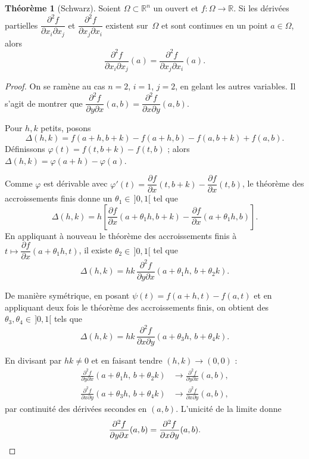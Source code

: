 \documentclass[12pt,a4paper,openany]{book}
\theoremstyle{definition}
\newtheorem{theoreme}{Théorème}[chapter]
\newcommand{\R}{\mathbb{R}}
\begin{document}
\begin{theoreme}[Schwarz]
  \label{thm:schwarz}
  Soient $\Omega \subset \R^n$ un ouvert et $f \colon \Omega \to \R$. Si les dérivées partielles $\dfrac{\partial^2 f}{\partial x_i \partial x_j}$ et $\dfrac{\partial^2 f}{\partial x_j \partial x_i}$ existent sur~$\Omega$ et sont continues en un point $a \in \Omega$, alors
  \[
    \frac{\partial^2 f}{\partial x_i \partial x_j}(a) = \frac{\partial^2 f}{\partial x_j \partial x_i}(a).
  \]
\end{theoreme}

\begin{proof}
  On se ramène au cas $n = 2$, $i = 1$, $j = 2$, en gelant les autres variables. Il s'agit de montrer que $\dfrac{\partial^2 f}{\partial y \partial x}(a,b) = \dfrac{\partial^2 f}{\partial x \partial y}(a,b)$.

  Pour $h, k$ petits, posons
  \[
    \Delta(h,k) = f(a+h, b+k) - f(a+h, b) - f(a, b+k) + f(a,b).
  \]
  Définissons $\varphi(t) = f(t, b+k) - f(t, b)$ ; alors $\Delta(h,k) = \varphi(a+h) - \varphi(a)$.

  Comme $\varphi$ est dérivable avec $\varphi'(t) = \dfrac{\partial f}{\partial x}(t, b+k) - \dfrac{\partial f}{\partial x}(t, b)$, le théorème des accroissements finis donne un $\theta_1 \in\, ]0,1[$ tel que
  \[
    \Delta(h,k) = h \left[\frac{\partial f}{\partial x}(a + \theta_1 h, b+k) - \frac{\partial f}{\partial x}(a + \theta_1 h, b)\right].
  \]
  En appliquant à nouveau le théorème des accroissements finis à $t \mapsto \dfrac{\partial f}{\partial x}(a + \theta_1 h, t)$, il existe $\theta_2 \in\, ]0,1[$ tel que
  \[
    \Delta(h,k) = hk \, \frac{\partial^2 f}{\partial y \partial x}(a + \theta_1 h, \, b + \theta_2 k).
  \]

  De manière symétrique, en posant $\psi(t) = f(a+h, t) - f(a, t)$ et en appliquant deux fois le théorème des accroissements finis, on obtient des $\theta_3, \theta_4 \in\, ]0,1[$ tels que
  \[
    \Delta(h,k) = hk \, \frac{\partial^2 f}{\partial x \partial y}(a + \theta_3 h, \, b + \theta_4 k).
  \]

  En divisant par $hk \neq 0$ et en faisant tendre $(h,k) \to (0,0)$ :
  \begin{align*}
    \frac{\partial^2 f}{\partial y \partial x}(a + \theta_1 h, \, b + \theta_2 k) &\xrightarrow[]{} \frac{\partial^2 f}{\partial y \partial x}(a,b), \\
    \frac{\partial^2 f}{\partial x \partial y}(a + \theta_3 h, \, b + \theta_4 k) &\xrightarrow[]{} \frac{\partial^2 f}{\partial x \partial y}(a,b),
  \end{align*}
  par continuité des dérivées secondes en $(a,b)$. L'unicité de la limite donne
  \[
    \frac{\partial^2 f}{\partial y \partial x}(a,b) = \frac{\partial^2 f}{\partial x \partial y}(a,b). \qedhere
  \]
\end{proof}
\end{document}
